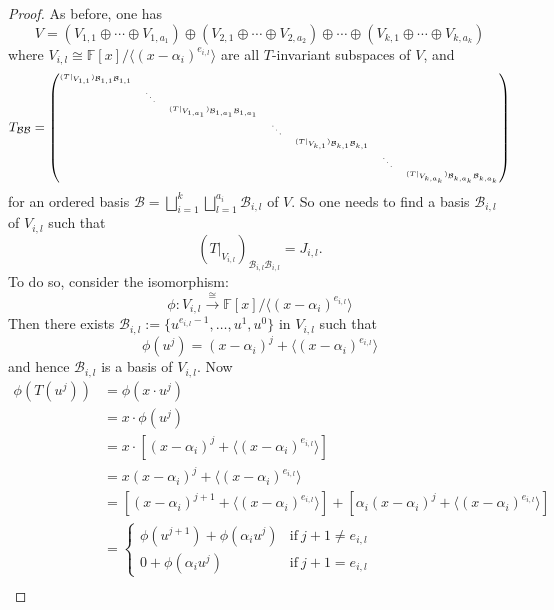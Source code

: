 \documentclass[12pt]{amsbook}
\begin{document}
\begin{proof}
As before, one has 
$$V= (V_{1,1} \oplus \cdots \oplus V_{1,a_1}) \oplus 
(V_{2,1} \oplus \cdots \oplus V_{2,a_2}) \oplus \cdots \oplus 
(V_{k,1} \oplus \cdots \oplus V_{k,a_k})$$
where $V_{i,l} \cong \mathbb{F}[x]/\langle (x-\alpha_i)^{e_{i,l}} \rangle$ are all $T$-invariant subspaces of $V$, and
$$T_{\mathcal{B}\mathcal{B}} = \tiny{\begin{pmatrix} (T|_{V_{1,1}})_{\mathcal{B}_{1,1}\mathcal{B}_{1,1}} & & & & & \\
& \ddots & & & & & \\ 
& & (T|_{V_{1,a_1}})_{\mathcal{B}_{1,a_1}\mathcal{B}_{1,a_1}} & & & & \\
& & & \ddots & & &\\
& & & & (T|_{V_{k,1}})_{\mathcal{B}_{k,1}\mathcal{B}_{k,1}} & & \\
& & & & & \ddots & \\
& & & & & & (T|_{V_{k,a_k}})_{\mathcal{B}_{k,a_k}\mathcal{B}_{k,a_k}}\end{pmatrix}}
$$
for an ordered basis $\displaystyle \mathcal{B} = \bigsqcup_{i=1}^k \bigsqcup_{l = 1}^{a_i} \mathcal{B}_{i,l}$ of $V$. So one needs to find a basis $\mathcal{B}_{i,l}$ of $V_{i,l}$ such that
$$(T|_{V_{i,l}})_{\mathcal{B}_{i,l}\mathcal{B}_{i,l}} = J_{i,l}.$$
To do so, consider the isomorphism:
$$\phi: V_{i,l} \xrightarrow{\cong} \mathbb{F}[x]/\langle (x-\alpha_i)^{e_{i,l}}\rangle$$
Then there exists $\mathcal{B}_{i,l} := \{u^{e_{i,l}-1}, \dots, u^{1}, u^0\}$ in $V_{i,l}$ such that
$$\phi(u^{j}) = (x-\alpha_i)^j + \langle (x - \alpha_i)^{e_{i,l}} \rangle$$
and hence $\mathcal{B}_{i,l}$ is a basis of $V_{i,l}$. Now
\begin{align*}\phi(T(u^j)) &= \phi(x \cdot u^j)\\
&= x \cdot \phi(u^j) \\
&= x \cdot [(x-\alpha_i)^j + \langle (x - \alpha_i)^{e_{i,l}} \rangle]\\ 
&= x(x-\alpha_i)^j + \langle (x - \alpha_i)^{e_{i,l}} \rangle \\
&= [(x-\alpha_i)^{j+1} + \langle (x - \alpha_i)^{e_{i,l}} \rangle] + [\alpha_i(x-\alpha_i)^{j} + \langle (x - \alpha_i)^{e_{i,l}} \rangle] \\
&= \begin{cases} \phi(u^{j+1}) + \phi( \alpha_i u^j) & \text{if}\ j+1 \neq e_{i,l} \\
0 + \phi( \alpha_i u^j) & \text{if}\ j+1 = e_{i,l} \end{cases} \\

\end{align*}
\end{proof}
\end{document}
